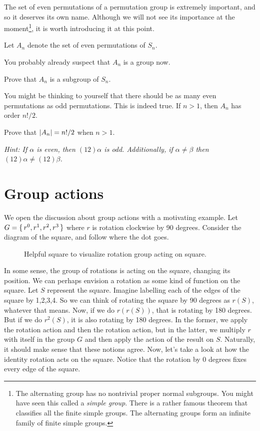 \documentclass[./main.tex]{subfiles}
\begin{document}
The set of even permutations of a permutation group is extremely important, and
so it deserves its own name. Although we will not see its importance at the
moment\footnote{The alternating group has no nontrivial proper normal subgroups.
You might have seen this called a \emph{simple group}. There is a rather famous
theorem that classifies all the finite simple groups. The alternating groups
form an infinite family of finite simple groups.}, it is worth introducing it at
this point.
\begin{definition}
\label{def:alternating-group}
    Let $A_n$ denote the set of even permutations of $S_n$.
\end{definition}
You probably already suspect that $A_n$ is a group now.
\begin{exercise}
    Prove that $A_n$ is a subgroup of $S_n$.
\end{exercise}

You might be thinking to yourself that there should be as many even permutations
as odd permutations. This is indeed true. If $n > 1$, then $A_n$ has order
$n!/2$. 
\begin{exercise}
    Prove that $\abs{A_n} = n!/2$ when $n > 1$. 

    \textit{Hint: If $\alpha$ is even, then $(12)\alpha$ is odd. Additionally, if $\alpha \neq \beta$ then $(12)\alpha \neq (12)\beta$.}
\end{exercise}

\section{Group actions}
We open the discussion about group actions with a motivating example. Let $G =
\set{r^0, r^1, r^2, r^3}$ where $r$ is rotation clockwise by 90 degrees.
Consider the diagram of the square, and follow where the dot goes.
\begin{figure}[h]
    \centering
    \caption{Helpful square to visualize rotation group acting on square.}
\end{figure}

In some sense, the group of rotations is acting on the square, changing its
position. We can perhaps envision a rotation as some kind of function on the
square. Let $S$ represent the square. Imagine labelling each of the edges of the
square by 1,2,3,4. So we can think of rotating the square by 90 degrees as
$r(S)$, whatever that means. Now, if we do $r(r(S))$, that is rotating by 180
degrees. But if we do $r^2 (S)$, it is also rotating by 180 degrees. In the
former, we apply the rotation action and then the rotation action, but in the
latter, we multiply $r$ with itself in the group $G$ and then apply the action
of the result on $S$. Naturally, it should make sense that these notions agree.
Now, let's take a look at how the identity rotation acts on the square. Notice
that the rotation by 0 degrees fixes every edge of the square.
\end{document}
